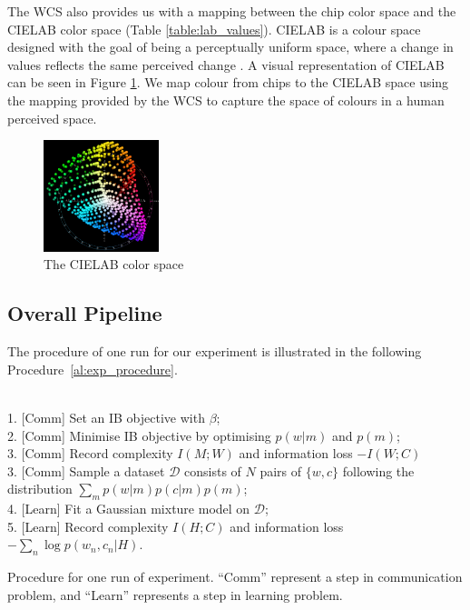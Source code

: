 \documentclass[11pt]{article}
\begin{document}
The WCS also provides us with a mapping between the chip color space and the CIELAB color space (Table \ref{table:lab_values}).
CIELAB is a colour space designed with the goal of being a perceptually uniform space, where a change in values reflects the same perceived change \cite{CIELAB}.
A visual representation of CIELAB can be seen in Figure \ref{fig:cielab}.
We map colour from chips to the CIELAB space using the mapping provided by the WCS to capture the space of colours in a human perceived space.


\begin{figure}[h]
    \centering
    \includegraphics[width=0.3\textwidth]{docs/intro_rate_distortion/graphs/CIELAB_color_space_top_view.png}
    \caption{The CIELAB color space}
    \label{fig:cielab}
\end{figure}


\subsection{Overall Pipeline}
\label{ssec:overall_pipeling}

The procedure of one run for our experiment is illustrated in the following Procedure~\ref{al:exp_procedure}.

\begin{algorithm}[h]
    \SetAlgoLined
     \\
    1. [Comm] Set an IB objective with $\beta$; \\
    2. [Comm] Minimise IB objective by optimising $p(w|m)$ and $p(m)$; \\
    3. [Comm] Record complexity $I(M;W)$ and information loss $-I(W;C)$ \\
    3. [Comm] Sample a dataset $\mathcal{D}$ consists of $N$ pairs of $\{w,c\}$ following the distribution $\sum_m p(w|m)p(c|m)p(m)$; \\
    4. [Learn] Fit a Gaussian mixture model on $\mathcal{D}$; \\
    5. [Learn] Record complexity $I(H;C)$ and information loss $-\sum_n\log p(w_n,c_n|H)$.
 \caption{Procedure for one run of experiment. ``Comm'' represent a step in communication problem, and ``Learn'' represents a step in learning problem.}
 \label{al:exp_procedure}
\end{algorithm}
\end{document}
